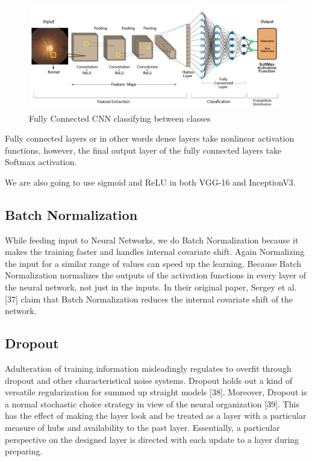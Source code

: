 \vspace{5mm}
\begin{figure}[hbt!]
\centering
\includegraphics[scale=0.45]{images/Fully Connected CNN classifying between classes.png}
\caption{Fully Connected CNN classifying between classes}
\label{fig:x Fully Connected CNN classifying between classes}
\end{figure}

\noindent Fully connected layers or in other words dense layers take nonlinear activation functions, however, the final output layer of the fully connected layers take Softmax activation.

\vspace{5mm}
\noindent We are also going to use sigmoid and ReLU in both VGG-16 and InceptionV3.

\vspace{5mm}
\subsection{Batch Normalization}

\vspace{5mm}
While feeding input to Neural Networks, we do Batch Normalization because it makes the training faster and handles internal covariate shift. Again Normalizing the input for a similar range of values can speed up the learning. Because Batch Normalization normalizes the outputs of the activation functions in every layer of the neural network, not just in the inputs. In their original paper, Sergey et al. [37] claim that Batch Normalization reduces the internal covariate shift of the network.

\vspace{5mm}
\subsection{Dropout}

\vspace{5mm}
Adulteration of training information misleadingly regulates to overfit through dropout and other characteristical noise systems. Dropout holds out a kind of versatile regularization for summed up straight models [38]. Moreover, Dropout is a normal stochastic choice strategy in view of the neural organization [39]. This has the effect of making the layer look and be treated as a layer with a particular measure of hubs and availability to the past layer. Essentially, a particular perspective on the designed layer is directed with each update to a layer during preparing.

